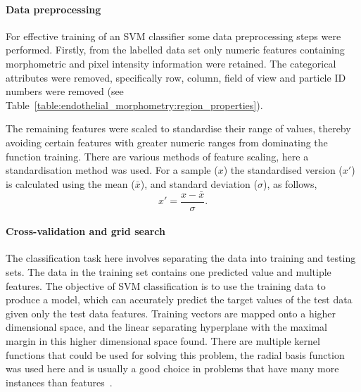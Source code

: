 \paragraph{Data preprocessing}
For effective training of an SVM classifier some data preprocessing steps were performed. Firstly, from the labelled data set only numeric features containing morphometric and pixel intensity information were retained. The categorical attributes were removed, specifically row, column, field of view and particle ID numbers were removed (see Table~\ref{table:endothelial_morphometry:region_properties}).

The remaining features were scaled to standardise their range of values, thereby avoiding certain features with greater numeric ranges from dominating the function training. There are various methods of feature scaling, here a standardisation method was used. For a sample ($x$) the standardised version ($x'$) is calculated using the mean ($\bar{x}$), and standard deviation ($\sigma$), as follows,
\begin{equation}
x'=\frac{x-\bar{x}}{\sigma}.
\end{equation}

\paragraph{Cross-validation and grid search}
The classification task here involves separating the data into training and testing sets. The data in the training set contains one predicted value and multiple features. The objective of SVM classification is to use the training data to produce a model, which can accurately predict the target values of the test data given only the test data features. Training vectors are mapped onto a higher dimensional space, and the linear separating hyperplane with the maximal margin in this higher dimensional space found. There are multiple kernel functions that could be used for solving this problem, the radial basis function was used here and is usually a good choice in problems that have many more instances than features~\cite{Hsu2008}.

